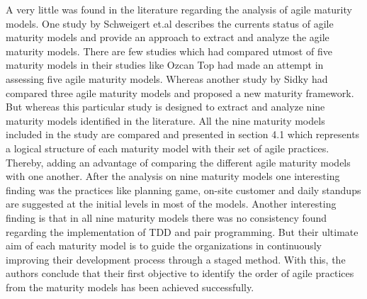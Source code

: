 \documentclass[a4paper,oneside]{bth}
\begin{document}
A very little was found in the literature regarding the analysis of agile maturity models. One study by Schweigert et.al \cite{schweigert_agile_2013} describes the currents status of agile maturity models and provide an approach to extract and analyze the agile maturity models. There are few studies which had compared utmost of five maturity models in their studies like Ozcan Top \cite{ozcan-top_assessment_2013} had made an attempt in assessing five agile maturity models. Whereas another study by Sidky \cite{sidky_structured_2007} had compared three agile maturity models and proposed a new maturity framework. But whereas this particular study is designed to extract and analyze nine maturity models identified in the literature. All the nine maturity models included in the study are compared and presented in section 4.1 which represents a logical structure of each maturity model with their set of agile practices. Thereby, adding an advantage of comparing the different agile maturity models with one another. After the analysis on nine maturity models one interesting finding was the practices like planning game, on-site customer and daily standups are suggested at the initial levels in most of the models. Another interesting finding is that in all nine maturity models there was no consistency found regarding the implementation of TDD and pair programming. But their ultimate aim of each maturity model is to guide the organizations in continuously improving their development process through a staged method. With this, the authors conclude that their first objective to identify the order of agile practices from the maturity models has been achieved successfully.
\end{document}
